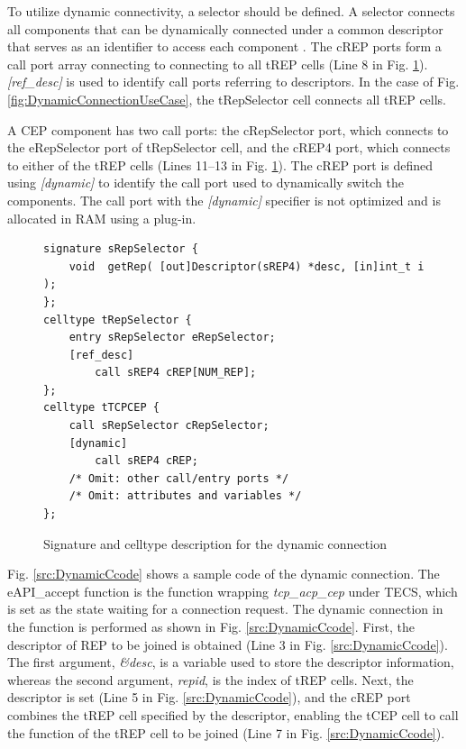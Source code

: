 \documentclass[a4j,12pt,oneside,openany,english]{jsbook}
\begin{document}
To utilize dynamic connectivity, a selector should be defined.
A selector connects all components that can be dynamically connected under a common descriptor that serves as an identifier to access each component \cite{par:optimization}.
The cREP ports form a call port array connecting to connecting to all tREP cells (Line 8 in Fig. \ref{src:DynamicCDLcode}).
{\it [ref\_desc]} is used to identify call ports referring to descriptors. 
In the case of Fig. \ref{fig:DynamicConnectionUseCase}, the tRepSelector cell connects all tREP cells.

A CEP component has two call ports: the cRepSelector port, which connects to the eRepSelector port of tRepSelector cell, and the cREP4 port, which connects to either of the tREP cells (Lines 11--13 in Fig. \ref{src:DynamicCDLcode}).
The cREP port is defined using {\it [dynamic]} to identify the call port used to dynamically switch the components.
The call port with the {\it [dynamic]} specifier is not optimized and is allocated in RAM using a plug-in.

\begin{figure}[t]
\centering
\begin{lstlisting}
signature sRepSelector {
    void  getRep( [out]Descriptor(sREP4) *desc, [in]int_t i );
};
celltype tRepSelector {
    entry sRepSelector eRepSelector;
    [ref_desc]
        call sREP4 cREP[NUM_REP];
};
celltype tTCPCEP {
    call sRepSelector cRepSelector;
    [dynamic]
        call sREP4 cREP;
    /* Omit: other call/entry ports */
    /* Omit: attributes and variables */
};
\end{lstlisting}
\caption{Signature and celltype description for the dynamic connection}
\label{src:DynamicCDLcode}
\end{figure}

Fig. \ref{src:DynamicCcode} shows a sample code of the dynamic connection.
The eAPI\_accept function is the function wrapping {\it tcp\_acp\_cep} under TECS, which is set as the state waiting for a connection request.
The dynamic connection in the function is performed as shown in Fig. \ref{src:DynamicCcode}.
First, the descriptor of REP to be joined is obtained (Line 3 in Fig. \ref{src:DynamicCcode}).
The first argument, {\it \&desc}, is a variable used to store the descriptor information, whereas the second argument, {\it repid}, is the index of tREP cells.
Next, the descriptor is set (Line 5 in Fig. \ref{src:DynamicCcode}), and the cREP port combines the tREP cell specified by the descriptor, enabling the tCEP cell to call the function of the tREP cell to be joined (Line 7 in Fig. \ref{src:DynamicCcode}).
\end{document}

